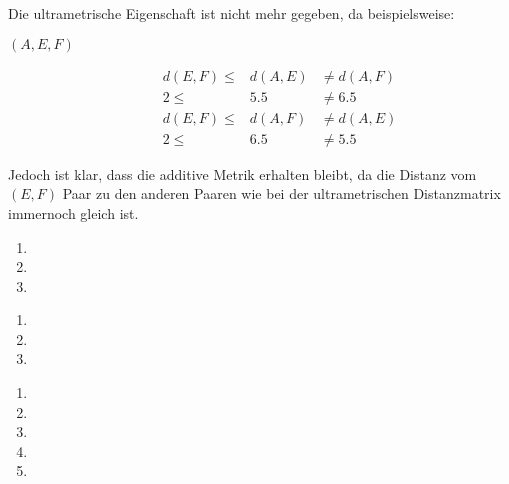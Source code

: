 \documentclass{homework}
\begin{document}
\begin{enumerate}
\begin{enumerate}
Die ultrametrische Eigenschaft ist nicht mehr gegeben, da beispielsweise:
\begin{description}
\item[$(A,E,F)$] \begin{eqnarray*}
d(E,F) \leq & d(A,E) & \neq d(A,F)\\
2 \leq & 5.5 & \neq 6.5\\
d(E,F) \leq & d(A,F) & \neq d(A,E)\\
2 \leq & 6.5 & \neq 5.5
\end{eqnarray*}
\end{description}
Jedoch ist klar, dass die additive Metrik erhalten bleibt, da die Distanz vom $(E,F)$ Paar zu den anderen Paaren wie bei der ultrametrischen Distanzmatrix immernoch gleich ist.
\end{enumerate}

\begin{enumerate}
\item
\item
\item
\end{enumerate}

\begin{enumerate}
\item
\item
\item
\end{enumerate}

\begin{enumerate}
\item
\item
\item
\item
\item
\end{enumerate}

\end{enumerate}
\end{document}
